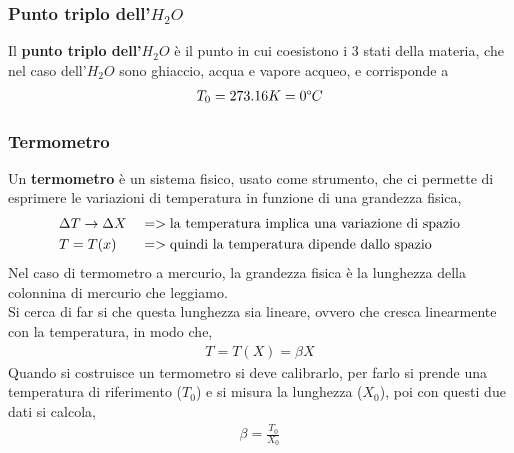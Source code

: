         \subsubsection{Punto triplo dell'$H_2O$}
            Il \textbf{punto triplo dell'$H_2O$} è il punto in cui coesistono i 3 stati della materia, che nel caso dell'$H_2O$ sono ghiaccio, acqua e vapore acqueo, e corrisponde a
            \begin{align*}
                T_0=273.16K=0\degree{}C
            \end{align*}

        \subsubsection{Termometro}
            Un \textbf{termometro} è un sistema fisico, usato come strumento, che ci permette di esprimere le variazioni di temperatura in funzione di una grandezza fisica,
            \begin{align*}
                &\Delta T\rightarrow\Delta X&&=>\textnormal{la temperatura implica una variazione di spazio}\\
                &T=T(x) && => \textnormal{quindi la temperatura dipende dallo spazio}
            \end{align*}
            Nel caso di termometro a mercurio, la grandezza fisica è la lunghezza della colonnina di mercurio che leggiamo.\\
            Si cerca di far si che questa lunghezza sia lineare, ovvero che cresca linearmente con la temperatura, in modo che,
            \begin{align*}
                T=T(X)=\beta X
            \end{align*}
            Quando si costruisce un termometro si deve calibrarlo, per farlo si prende una temperatura di riferimento ($T_0$) e si misura la lunghezza ($X_0$), poi con questi due dati si calcola,
            \begin{align*}
                \beta=\frac{T_0}{X_0}
            \end{align*}


